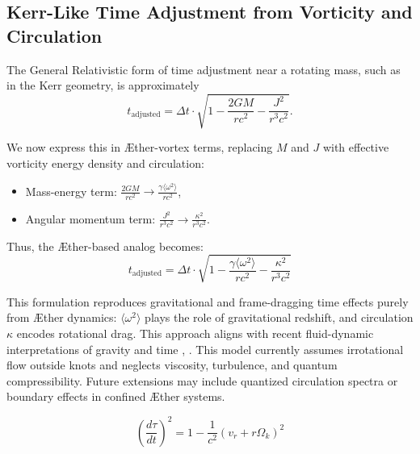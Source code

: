 \subsection*{Kerr-Like Time Adjustment from Vorticity and Circulation}

The General Relativistic form of time adjustment near a rotating mass, such as in the Kerr geometry, is approximately
\begin{equation}
    t_{\text{adjusted}} = \Delta t \cdot \sqrt{1 - \frac{2GM}{rc^2} - \frac{J^2}{r^3 c^2}}.
    \label{eq:kerrtime}
\end{equation}

We now express this in Æther-vortex terms, replacing $M$ and $J$ with effective vorticity energy density and circulation:
\begin{itemize}
    \item Mass-energy term: $\displaystyle \frac{2GM}{rc^2} \rightarrow \frac{\gamma \langle \omega^2 \rangle}{rc^2}$,
    \item Angular momentum term: $\displaystyle \frac{J^2}{r^3 c^2} \rightarrow \frac{\kappa^2}{r^3 c^2}$.
\end{itemize}

Thus, the Æther-based analog becomes:
\begin{equation}
    \boxed{
        t_{\text{adjusted}} = \Delta t \cdot \sqrt{
            1 - \frac{\gamma \langle \omega^2 \rangle}{r c^2}
            - \frac{\kappa^2}{r^3 c^2}
        }
    }
    \label{eq:ae_kerr}
\end{equation}

This formulation reproduces gravitational and frame-dragging time effects purely from Æther dynamics: $\langle \omega^2 \rangle$ plays the role of gravitational redshift, and circulation $\kappa$ encodes rotational drag. This approach aligns with recent fluid-dynamic interpretations of gravity and time \cite{barcelo2011analogue}, \cite{fedi2017gravity}.
This model currently assumes irrotational flow outside knots and neglects viscosity, turbulence, and quantum compressibility. Future extensions may include quantized circulation spectra or boundary effects in confined Æther systems.

\begin{equation}
    \boxed{
        \left(\frac{d\tau}{dt}\right)^2 = 1 - \frac{1}{c^2} \left( v_r + r\Omega_k \right)^2
    }
\end{equation}
